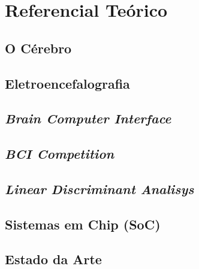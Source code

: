 
\chapter[Referencial Teórico]{Referencial Teórico}

\section{O Cérebro}

\section{Eletroencefalografia}

\section{\textit{Brain Computer Interface}}

\section{\textit{BCI Competition}}

\section{\textit{Linear Discriminant Analisys}}

\section{Sistemas em Chip (SoC)}

\section{Estado da Arte}



